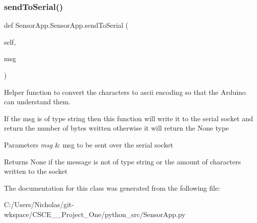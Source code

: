 \subsubsection{\texorpdfstring{send\+To\+Serial()}{sendToSerial()}}
{\footnotesize\ttfamily def Sensor\+App.\+Sensor\+App.\+send\+To\+Serial (\begin{DoxyParamCaption}\item[{}]{self,  }\item[{}]{msg }\end{DoxyParamCaption})}



Helper function to convert the characters to ascii encoding so that the Arduino can understand them. 

If the msg is of type string then this function will write it to the serial socket and return the number of bytes written otherwise it will return the None type


\begin{DoxyParams}{Parameters}
{\em msg} & msg to be sent over the serial socket\\
\hline
\end{DoxyParams}
\begin{DoxyReturn}{Returns}
None if the message is not of type string or the amount of characters written to the socket 
\end{DoxyReturn}


The documentation for this class was generated from the following file\+:\begin{DoxyCompactItemize}
\item 
C\+:/\+Users/\+Nicholas/git-\/wkspace/\+C\+S\+C\+E\+\_\+\_\+\+Project\+\_\+\+One/python\+\_\+src/Sensor\+App.\+py\end{DoxyCompactItemize}
